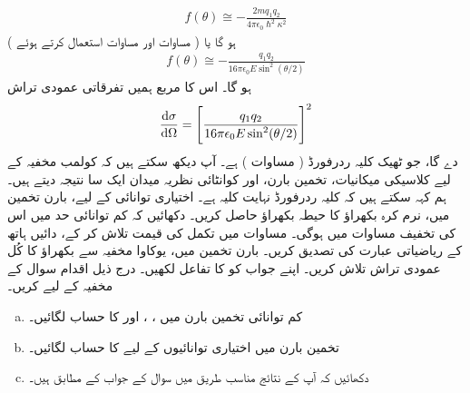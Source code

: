 \begin{align}
	f(\theta)\cong-\frac{2mq_1q_2}{4\pi\epsilon_0\hslash^2\kappa^2}
\end{align}
ہو گا یا ( مساوات  اور مساوات  استعمال کرتے ہوئے ) 
\begin{align}
	f(\theta)\cong-\frac{q_1q_2}{16\pi\epsilon_0E\sin^2(\theta/2)}
\end{align}
ہو گا۔ اس کا مربع ہمیں تفرقاتی عمودی تراش 
\begin{align}
	\frac{\dif\sigma}{\dif\Omega}=\left[\frac{q_1q_2}{16\pi\epsilon_0E\sin^2(\theta/2)}\right]^2
\end{align}
دے گا، جو ٹھیک کلیہ ردرفورڈ ( مساوات ) ہے۔ آپ دیکھ سکتے ہیں کہ کولمب مخفیہ کے لیے کلاسیکی میکانیات، تخمین بارن، اور کوانٹائی نظریہ میدان ایک سا  نتیجہ دیتے ہیں۔ ہم کہہ سکتے ہیں کہ کلیہ ردرفورڈ نہایت  کلیہ ہے۔
اختیاری توانائی کے لیے، بارن تخمین میں، نرم کرہ بکھراؤ کا حیطہ بکھراؤ حاصل کریں۔ دکھائیں کہ کم توانائی حد میں اس کی تخفیف مساوات  میں ہوگی۔
مساوات  میں تکمل کی قیمت تلاش کر کے، دائیں ہاتھ کے ریاضیاتی عبارت کی تصدیق کریں۔
بارن تخمین میں، یوکاوا مخفیہ سے بکھراؤ کا کُل عمودی تراش تلاش کریں۔ اپنے جواب کو  کا تفاعل لکھیں۔
درج ذیل اقدام سوال  کے مخفیہ کے لیے کریں۔
\begin{enumerate}[a.]
\item
 کم توانائی تخمین بارن میں ، ، اور  کا حساب لگائیں۔
\item
 تخمین بارن میں اختیاری توانائیوں کے لیے  کا حساب لگائیں۔
\item
دکھائیں کہ آپ کے نتائج مناسب طریق میں سوال  کے جواب کے مطابق ہیں۔
\end{enumerate}


